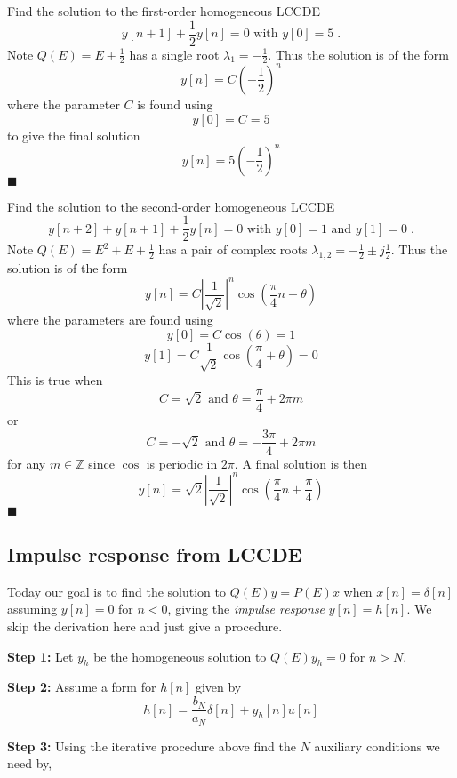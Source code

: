 \begin{example}
  Find the solution to the first-order homogeneous LCCDE
  \[
  y[n+1] + \frac{1}{2}y[n] = 0 \mbox{ with } y[0] = 5 \; .
  \]
  Note $Q(E) = E + \frac{1}{2}$ has a single root $\lambda_1 = -\frac{1}{2}$. Thus the solution is of the form
  \[
  y[n] = C\left( -\frac{1}{2}\right)^n
  \]
  where the parameter $C$ is found using
  \[
  y[0] = C = 5
  \]
  to give the final solution
  \[
  y[n] = 5\left( -\frac{1}{2}\right)^n
  \]
  $\blacksquare$  
\end{example}

\begin{example}
  Find the solution to the second-order homogeneous LCCDE
  \[
  y[n+2] + y[n+1] + \frac{1}{2}y[n] = 0 \mbox{ with } y[0] = 1 \mbox{ and } y[1] = 0\; .
  \]
  Note $Q(E) = E^2 + E + \frac{1}{2}$ has a pair of complex roots $\lambda_{1,2} = -\frac{1}{2} \pm j\frac{1}{2}$. Thus the solution is of the form
  \[
  y[n] = C \left|\frac{1}{\sqrt{2}}\right|^n\cos\left(\frac{\pi}{4} n + \theta\right)
  \]
  where the parameters are found using
  \[
  y[0] = C\cos\left(\theta\right) = 1
  \]
  \[
  y[1] = C\frac{1}{\sqrt{2}}\cos\left(\frac{\pi}{4} + \theta\right) = 0
  \]
  This is true when
  \[
  C = \sqrt{2} \mbox{ and } \theta = \frac{\pi}{4} + 2\pi m
  \]
  or
  \[      
  C = -\sqrt{2} \mbox{ and } \theta = -\frac{3\pi}{4} + 2\pi m
  \]
  for any $m\in \mathbb{Z}$ since $\cos$ is periodic in $2\pi$. A final solution is then
  \[
  y[n] = \sqrt{2} \left|\frac{1}{\sqrt{2}}\right|^n\cos\left(\frac{\pi}{4} n + \frac{\pi}{4}\right)
  \]
  $\blacksquare$
\end{example}

\subsection{Impulse response from LCCDE}

Today our goal is to find the solution to $Q(E)y=P(E)x$ when $x[n] = \delta[n]$ assuming $y[n] = 0$ for $n < 0$, giving the \emph{impulse response} $y[n] = h[n]$. We skip the derivation here and just give a procedure.

\textbf{Step 1:} Let $y_h$ be the homogeneous solution to $Q(E)y_h=0$ for $n > N$.

\textbf{Step 2:} Assume a form for $h[n]$ given by
\[
h[n] = \frac{b_N}{a_N}\delta[n] + y_h[n]u[n]
\]

\textbf{Step 3:} Using the iterative procedure above find the $N$ auxiliary conditions we need by,

